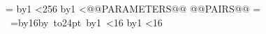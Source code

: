 \documentclass{article}
\begin{document}
\lokadfont\frenchspacing
{}
\loop
  =\hbox{\char\lokadslot}
  \advance\lokadslot by1
\ifnum\lokadslot<256\repeat
{}
\loop
  \advance\lokadslot by1
\ifnum\lokadslot<@@PARAMETERS@@\repeat
@@PAIRS@@
=\vbox{\offinterlineskip
  \loop
    \hbox{
      \loop
        \lokadslot=\lokadrow\multiply\lokadslot by16\advance\lokadslot by\lokadcolumn
        \hbox to24pt{\char\lokadslot\hss}%
        \advance\lokadcolumn by1
      \ifnum\lokadcolumn<16\repeat}
    \kern16pt
    \advance\lokadrow by1
  \ifnum\lokadrow<16\repeat}
\shipout{}
\end{document}
